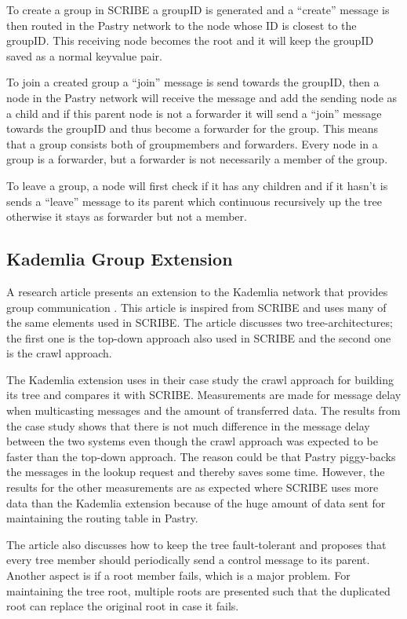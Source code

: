To create a group in SCRIBE a groupID is generated and a ``create'' message is then routed in the Pastry network to the node whose ID is closest to the groupID. This receiving node becomes the root and it will keep the groupID saved as a normal keyvalue pair.

To join a created group a ``join'' message is send towards the groupID, then a node in the Pastry network will receive the message and add the sending node as a child and if this parent node is not a forwarder it will send a ``join'' message towards the groupID and thus become a forwarder for the group. This means that a group consists both of groupmembers and forwarders. Every node in a group is a forwarder, but a forwarder is not necessarily a member of  the group. 

To leave a group, a node will first check if it has any children and if it hasn't is sends a ``leave'' message to its parent which continuous recursively up the tree otherwise it stays as forwarder but not a member.

 
\subsection{Kademlia Group Extension}
A research article presents an extension to the Kademlia network that provides group communication \cite{groKdml}. This article is inspired from SCRIBE and uses many of the same elements used in SCRIBE. The article discusses two tree-architectures; the first one is the top-down approach also used in SCRIBE and the second one is the crawl approach.

The Kademlia extension uses in their case study the crawl approach for building its tree and compares it with SCRIBE. Measurements are made for message delay when multicasting messages and the amount of transferred data. The results from the case study shows that there is not much difference in the message delay between the two systems even though the crawl approach was expected to be faster than the top-down approach. The reason could be that Pastry piggy-backs the messages in the lookup request and thereby saves some time. However, the results for the other measurements are as expected where SCRIBE uses more data than the Kademlia extension because of the huge amount of data sent for maintaining the routing table in Pastry.

The article also discusses how to keep the tree fault-tolerant and proposes that every tree member should periodically send a control message to its parent. Another aspect is if a root member fails, which is a major problem. For maintaining the tree root, multiple roots are presented such that the duplicated root can replace the original root in case it fails.


